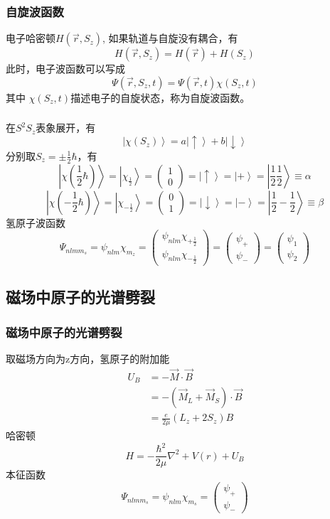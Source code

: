 \begin{frame}[label=current]
  \frametitle{自旋波函数}
电子哈密顿$ H (\vec{r},S_z)  $, 如果轨道与自旋没有耦合，有 
\[ H (\vec{r},S_z) = H (\vec{r}) + H (S_z)\]
此时，电子波函数可以写成
\[\Psi(\vec{r}, S_z, t)  = \Psi(\vec{r}, t)  \chi (S_z, t) \] 
其中 $\chi (S_z, t)$描述电子的自旋状态，称为自旋波函数。
\end{frame} 

\begin{frame}[label=current]
  \frametitle{}
在$S^2 S_z$表象展开，有
\[ \left \vert\chi (S_z) \right\rangle = a \left\vert \uparrow \right\rangle + b \left\vert \downarrow \right\rangle \]
分别取$S_z=\pm \frac{1}{2}\hbar$，有
\[ 
  \left \vert\chi (\frac{1}{2}\hbar) \right\rangle  =\left \vert\chi _{\frac{1}{2}} \right\rangle= \begin{pmatrix}
  1 \\
  0 
 \end{pmatrix} = \left\vert \uparrow \right\rangle = \left\vert + \right\rangle = \left\vert \frac{1}{2} \frac{1}{2} \right\rangle \equiv \alpha \]
 \[ 
  \left \vert\chi (-\frac{1}{2}\hbar) \right\rangle  =\left \vert\chi _{-\frac{1}{2}} \right\rangle= \begin{pmatrix}
  0 \\
  1 
 \end{pmatrix} = \left\vert \downarrow \right\rangle = \left\vert - \right\rangle = \left\vert \frac{1}{2} -\frac{1}{2} \right\rangle  \equiv \beta\]
 氢原子波函数
 \[\Psi _{nlmm_s}  = \psi _{nlm}  \chi _{m_z} = \begin{pmatrix}
  \psi _{nlm} \chi _{+\frac{1}{2}} \\
  \psi _{nlm} \chi _{-\frac{1}{2}} 
 \end{pmatrix}  = \begin{pmatrix}
  \psi _{+} \\
  \psi _{-} 
 \end{pmatrix} = \begin{pmatrix}
  \psi _{1} \\
  \psi _{2} 
 \end{pmatrix}\] 
\end{frame} 

\subsection{磁场中原子的光谱劈裂}

\begin{frame}
  \frametitle{磁场中原子的光谱劈裂}
  \解 取磁场方向为z方向，氢原子的附加能
  \[ \begin{aligned}
   U_B &= -\vec{M}\cdot \vec{B} \\ 
   &= -(\vec{M}_L +\vec{M}_S )\cdot \vec{B} \\
   &= \frac{e}{2 \mu } (L_z + 2S_z)B
  \end{aligned} \]
  哈密顿
  \[H= - \frac{\hbar^2}{2\mu} \nabla^2 +V(r) + U_B\]
  本征函数
  \[\Psi _{nlmm_s}  = \psi _{nlm}  \chi _{m_s} = \begin{pmatrix}
    \psi _{+} \\
    \psi _{-} 
   \end{pmatrix} \]
\end{frame} 

